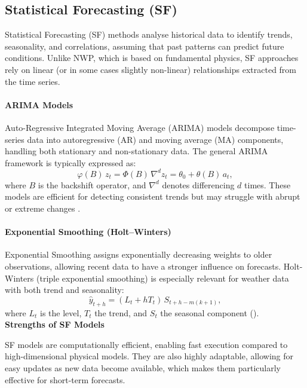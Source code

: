 \subsection{Statistical Forecasting (SF)}
\label{statistical_forecasting}
Statistical Forecasting (SF) methods analyse historical data to identify trends, seasonality, and correlations, assuming that past patterns can predict future conditions. Unlike NWP, which is based on fundamental physics, SF approaches rely on linear (or in some cases slightly non-linear) relationships extracted from the time series.

\paragraph{ARIMA Models}
Auto-Regressive Integrated Moving Average (ARIMA) models decompose time-series data into autoregressive (AR) and moving average (MA) components, handling both stationary and non-stationary data. The general ARIMA framework is typically expressed as:
\begin{equation}
    \varphi(B) \, z_t = \Phi(B) \, \nabla^d z_t = \theta_0 + \theta(B) \, a_t,
    \label{eq:general_arima}
\end{equation}
where $B$ is the backshift operator, and $\nabla^d$ denotes differencing $d$ times. These models are efficient for detecting consistent trends but may struggle with abrupt or extreme changes \cite{box2015time}.

\paragraph{Exponential Smoothing (Holt--Winters)}
Exponential Smoothing assigns exponentially decreasing weights to older observations, allowing recent data to have a stronger influence on forecasts. Holt-Winters (triple exponential smoothing) is especially relevant for weather data with both trend and seasonality:
\begin{equation}
    \hat{y}_{t+h} = (L_t + h T_t) \, S_{t+h - m(k+1)},
    \label{eq:forecast_holt_winters}
\end{equation}
where $L_t$ is the level, $T_t$ the trend, and $S_t$ the seasonal component (\cite{hyndman2018forecasting}).\\

\noindent\textbf{Strengths of SF Models}

\noindent SF models are computationally efficient, enabling fast execution compared to high-dimensional physical models. They are also highly adaptable, allowing for easy updates as new data become available, which makes them particularly effective for short-term forecasts.\\

